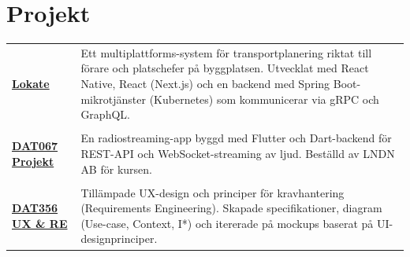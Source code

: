 \section{Projekt}\label{sec:projects-&-course-projects}
\begin{tabular}{>{\footnotesize\bfseries} p{32pt} >{\footnotesize}p{}}
    \href{https://web.archive.org/web/20250613073516/lokate.io}{Lokate} &
    Ett multiplattforms-system för transportplanering riktat till förare och platschefer på byggplatsen.
    Utvecklat med React Native, React (Next.js) och en backend med Spring Boot-mikrotjänster (Kubernetes) som kommunicerar via gRPC och GraphQL.
    \vspace{6px} \\ \\

    \href{https://www.student.chalmers.se/sp/course?course_id=34088}{DAT067 Projekt} &
    En radiostreaming-app byggd med Flutter och Dart-backend för REST-API och WebSocket-streaming av ljud.
    Beställd av LNDN AB för kursen.
    \vspace{6px} \\ \\
    \href{https://www.student.chalmers.se/sp/course?course_id=33536}{DAT356 UX \& RE} &
    Tillämpade UX-design och principer för kravhantering (Requirements Engineering).
    Skapade specifikationer, diagram (Use-case, Context, I*) och itererade på mockups baserat på UI-designprinciper.
\end{tabular}
